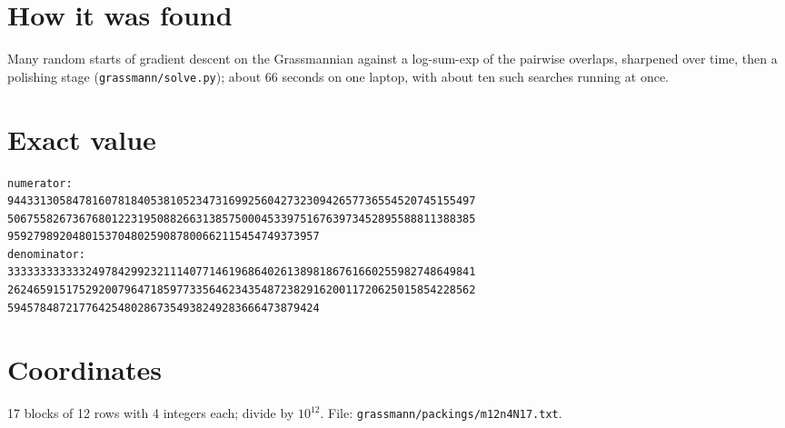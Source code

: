 \documentclass[11pt,a4paper]{article}
\begin{document}
\section{How it was found}
Many random starts of gradient descent on the Grassmannian against a log-sum-exp of the pairwise overlaps, sharpened over time, then a polishing stage (\texttt{grassmann/solve.py}); about 66 seconds on one laptop, with about ten such searches running at once.


\appendix
\section{Exact value}
{\small
\begin{verbatim}
numerator:
944331305847816078184053810523473169925604273230942657736554520745155497
506755826736768012231950882663138575000453397516763973452895588811388385
959279892048015370480259087800662115454749373957
denominator:
333333333333249784299232111407714619686402613898186761660255982748649841
262465915175292007964718597733564623435487238291620011720625015854228562
594578487217764254802867354938249283666473879424
\end{verbatim}}

\section{Coordinates}
17 blocks of 12 rows with 4 integers each; divide by $10^{12}$. File: \texttt{grassmann/packings/m12n4N17.txt}.
{\tiny
\begin{multicols}{3}
\end{multicols}}
\end{document}

